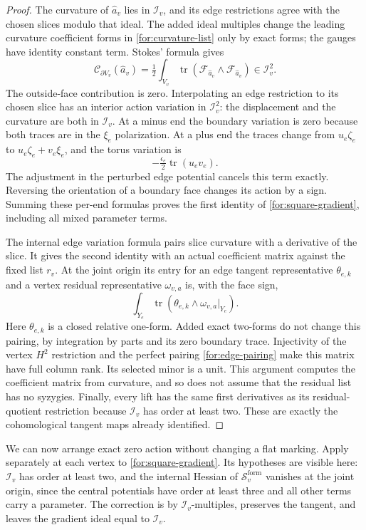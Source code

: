 \begin{proof}
The curvature of $\widehat a_v$ lies in $\mathcal I_v$, and its edge
restrictions agree with the chosen slices modulo that ideal.  The
added ideal multiples change the leading curvature coefficient forms
in \eqref{for:curvature-list} only by exact forms; the gauges have
identity constant term.  Stokes' formula gives
\[
 \mathcal C_{\partial V_v}(\widehat a_v)
   =\tfrac12\int_{V_v}\operatorname{tr}
                 (\mathcal F_{\widehat a_v}\wedge
                  \mathcal F_{\widehat a_v})\in\mathcal I_v^2.
\]
The outside-face contribution is zero.  Interpolating an edge
restriction to its chosen slice has an interior action variation in
$\mathcal I_v^2$: the displacement and the curvature are both in
$\mathcal I_v$.  At a minus end the boundary variation is zero because
both traces are in the $\xi_e$ polarization.  At a plus end the traces
change from $u_e\zeta_e$ to $u_e\zeta_e+v_e\xi_e$, and the torus
variation is
\[
 -\tfrac{\epsilon_e}{2}\operatorname{tr}(u_ev_e).
\]
The adjustment in the perturbed edge potential cancels this term
exactly.  Reversing the orientation of a boundary face changes its
action by a sign.  Summing these per-end formulas proves the first
identity of \eqref{for:square-gradient}, including all mixed parameter
terms.

The internal edge variation formula pairs slice curvature with a
derivative of the slice.  It gives the second identity with an actual
coefficient matrix against the fixed list $r_v$.  At the joint origin
its entry for an edge tangent representative $\theta_{e,k}$ and a
vertex residual representative $\omega_{v,a}$ is, with the face sign,
\[
 \int_{Y_e}\operatorname{tr}
           (\theta_{e,k}\wedge\omega_{v,a}|_{Y_e}).
\]
Here $\theta_{e,k}$ is a closed relative one-form.  Added exact
two-forms do not change this pairing, by integration by parts and its
zero boundary trace.  Injectivity of the vertex $H^2$ restriction and
the perfect pairing \eqref{for:edge-pairing} make this matrix have full
column rank.  Its selected minor is a unit.  This argument computes
the coefficient matrix from curvature, and so does not assume that
the residual list has no syzygies.  Finally, every lift has the same
first derivatives as its residual-quotient restriction because
$\mathcal I_v$ has order at least two.  These are exactly the
cohomological tangent maps already identified.
\end{proof}

We can now arrange exact zero action without changing a flat marking.
Apply \cite[Lemma~6.4]{MT} separately at each vertex to
\eqref{for:square-gradient}.  Its hypotheses are visible here:
$\mathcal I_v$ has order at least two, and the internal Hessian of
$\mathcal S_v^{\mathrm{form}}$ vanishes at the joint origin, since the
central potentials have order at least three and all other terms carry
a parameter.  The correction is by $\mathcal I_v$-multiples, preserves
the tangent, and leaves the gradient ideal equal to $\mathcal I_v$.


